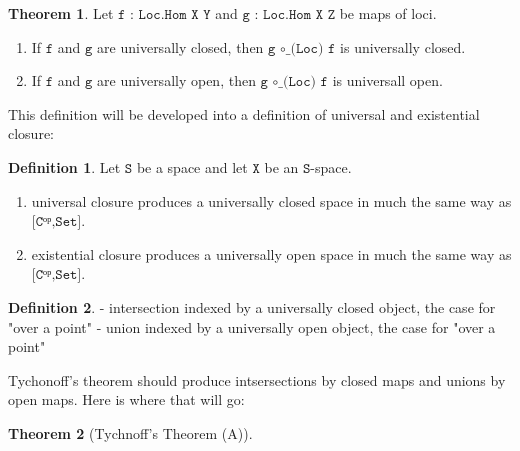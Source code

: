 \documentclass{book}
\theoremstyle{definition}
\newtheorem{definition}{Definition}
\newtheorem{theorem}{Theorem}
\begin{document}
\begin{theorem}
Let $\texttt{f : Loc.Hom X Y}$ and $\texttt{g : Loc.Hom X Z}$ be maps of loci.
\begin{enumerate}
\item If $\texttt{f}$ and $\texttt{g}$ are universally closed, then $\texttt{g ∘\_(Loc) f}$ is universally closed.
\item If $\texttt{f}$ and $\texttt{g}$ are universally open, then $\texttt{g ∘\_(Loc) f}$ is universall open. 
\end{enumerate}
\end{theorem}

This definition will be developed into a definition of universal and existential closure:

\begin{definition}
Let $\texttt{S}$ be a space and let $\texttt{X}$ be an $\texttt{S}$-space. 
\begin{enumerate}
\item universal closure produces a universally closed space in much the same way as $\texttt{[Cᵒᵖ,Set]}$.
\item existential closure produces a universally open space in much the same way as $\texttt{[Cᵒᵖ,Set]}$.
\end{enumerate}
\end{definition}

\begin{definition}
- intersection indexed by a universally closed object, the case for "over a point"
- union indexed by a universally open object, the case for "over a point"
\end{definition}

Tychonoff's theorem should produce intsersections by closed maps and unions by open maps. Here is where that will go:

\begin{theorem}[Tychnoff's Theorem (A)]

\end{theorem}
\end{document}
